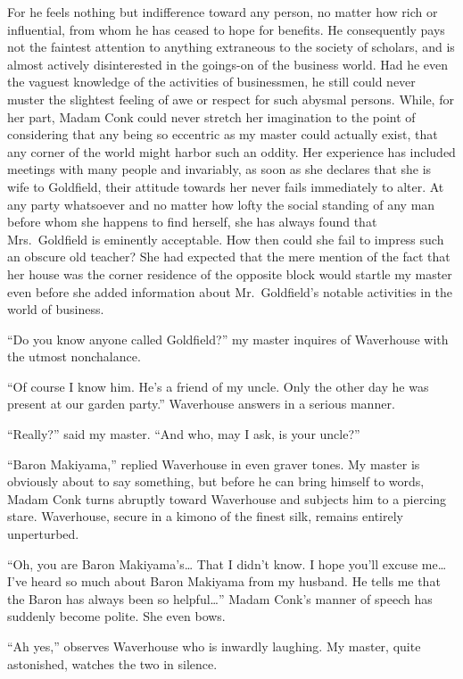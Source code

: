 \documentclass{book}
\begin{document}
For he feels nothing but indifference toward any person, no matter how
rich or influential, from whom he has ceased to hope for benefits. He
consequently pays not the faintest attention to anything extraneous to
the society of scholars, and is almost actively disinterested in the
goings-on of the business world. Had he even the vaguest knowledge of
the activities of businessmen, he still could never muster the slightest
feeling of awe or respect for such abysmal persons. While, for her part,
Madam Conk could never stretch her imagination to the point of
considering that any being so eccentric as my master could actually
exist, that any corner of the world might harbor such an oddity. Her
experience has included meetings with many people and invariably, as
soon as she declares that she is wife to Goldfield, their attitude
towards her never fails immediately to alter. At any party whatsoever
and no matter how lofty the social standing of any man before whom she
happens to find herself, she has always found that Mrs.~Goldfield is
eminently acceptable. How then could she fail to impress such an obscure
old teacher? She had expected that the mere mention of the fact that her
house was the corner residence of the opposite block would startle my
master even before she added information about Mr.~Goldfield's notable
activities in the world of business.

``Do you know anyone called Goldfield?'' my master inquires of
Waverhouse with the utmost nonchalance.

``Of course I know him. He's a friend of my uncle. Only the other day he
was present at our garden party.'' Waverhouse answers in a serious
manner.

``Really?'' said my master. ``And who, may I ask, is your uncle?''

``Baron Makiyama,'' replied Waverhouse in even graver tones. My master
is obviously about to say something, but before he can bring himself to
words, Madam Conk turns abruptly toward Waverhouse and subjects him to a
piercing stare. Waverhouse, secure in a kimono of the finest silk,
remains entirely unperturbed.

``Oh, you are Baron Makiyama's\ldots{} That I didn't know. I hope you'll
excuse me\ldots{} I've heard so much about Baron Makiyama from my
husband. He tells me that the Baron has always been so helpful\ldots{}''
Madam Conk's manner of speech has suddenly become polite. She even bows.

``Ah yes,'' observes Waverhouse who is inwardly laughing. My master,
quite astonished, watches the two in silence.
\end{document}
